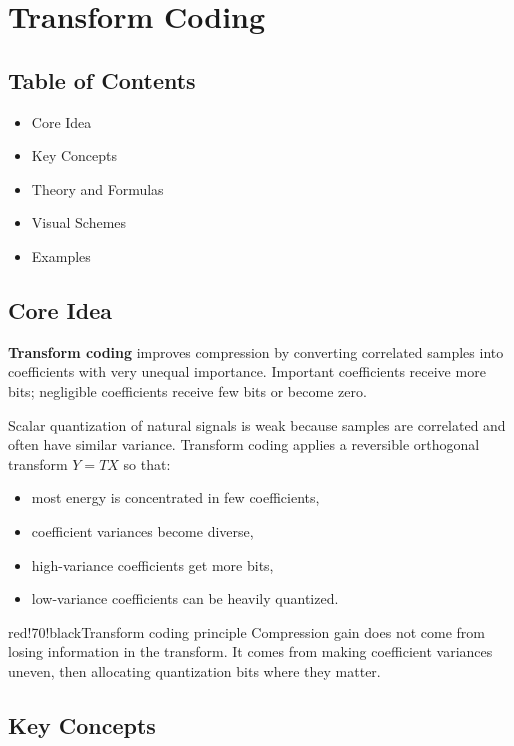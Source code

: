 \chapter{Transform Coding}

\section{Table of Contents}

\begin{itemize}
  \item Core Idea
  \item Key Concepts
  \item Theory and Formulas
  \item Visual Schemes
  \item Examples
\end{itemize}

\section{Core Idea}

\textbf{Transform coding} improves compression by converting correlated samples into coefficients with very unequal importance. Important coefficients receive more bits; negligible coefficients receive few bits or become zero.

Scalar quantization of natural signals is weak because samples are correlated and often have similar variance. Transform coding applies a reversible orthogonal transform $Y=TX$ so that:

\begin{itemize}
  \item most energy is concentrated in few coefficients,
  \item coefficient variances become diverse,
  \item high-variance coefficients get more bits,
  \item low-variance coefficients can be heavily quantized.
\end{itemize}

\begin{calloutbox}{red!70!black}{Transform coding principle}
Compression gain does not come from losing information in the transform. It comes from making coefficient variances uneven, then allocating quantization bits where they matter.
\end{calloutbox}

\section{Key Concepts}

